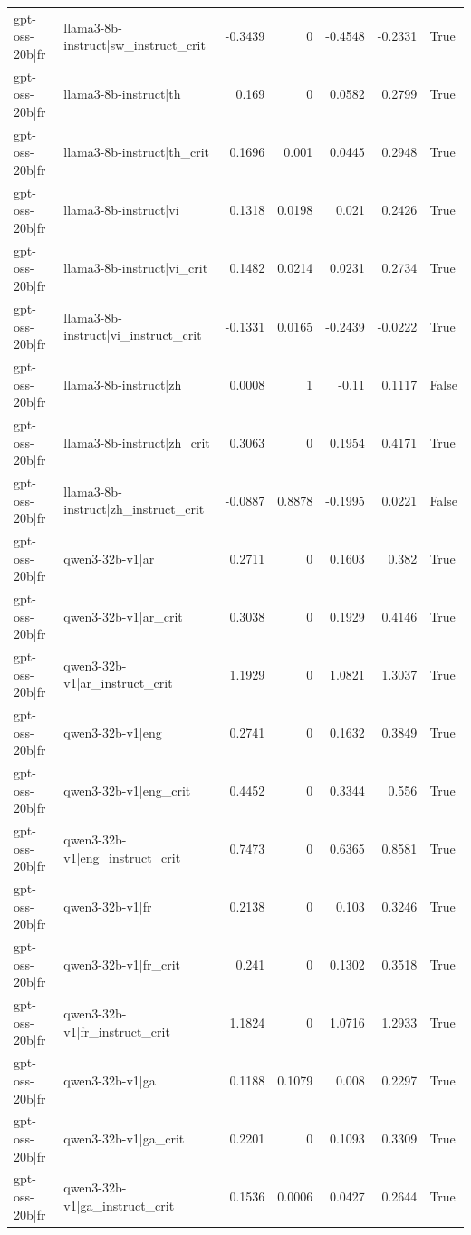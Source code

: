 \begin{table}
\begin{tabular}{l l r r r r l}
gpt-oss-20b|fr & llama3-8b-instruct|sw_instruct_crit & -0.3439 & 0 & -0.4548 & -0.2331 & True \\
gpt-oss-20b|fr & llama3-8b-instruct|th & 0.169 & 0 & 0.0582 & 0.2799 & True \\
gpt-oss-20b|fr & llama3-8b-instruct|th_crit & 0.1696 & 0.001 & 0.0445 & 0.2948 & True \\
gpt-oss-20b|fr & llama3-8b-instruct|vi & 0.1318 & 0.0198 & 0.021 & 0.2426 & True \\
gpt-oss-20b|fr & llama3-8b-instruct|vi_crit & 0.1482 & 0.0214 & 0.0231 & 0.2734 & True \\
gpt-oss-20b|fr & llama3-8b-instruct|vi_instruct_crit & -0.1331 & 0.0165 & -0.2439 & -0.0222 & True \\
gpt-oss-20b|fr & llama3-8b-instruct|zh & 0.0008 & 1 & -0.11 & 0.1117 & False \\
gpt-oss-20b|fr & llama3-8b-instruct|zh_crit & 0.3063 & 0 & 0.1954 & 0.4171 & True \\
gpt-oss-20b|fr & llama3-8b-instruct|zh_instruct_crit & -0.0887 & 0.8878 & -0.1995 & 0.0221 & False \\
gpt-oss-20b|fr & qwen3-32b-v1|ar & 0.2711 & 0 & 0.1603 & 0.382 & True \\
gpt-oss-20b|fr & qwen3-32b-v1|ar_crit & 0.3038 & 0 & 0.1929 & 0.4146 & True \\
gpt-oss-20b|fr & qwen3-32b-v1|ar_instruct_crit & 1.1929 & 0 & 1.0821 & 1.3037 & True \\
gpt-oss-20b|fr & qwen3-32b-v1|eng & 0.2741 & 0 & 0.1632 & 0.3849 & True \\
gpt-oss-20b|fr & qwen3-32b-v1|eng_crit & 0.4452 & 0 & 0.3344 & 0.556 & True \\
gpt-oss-20b|fr & qwen3-32b-v1|eng_instruct_crit & 0.7473 & 0 & 0.6365 & 0.8581 & True \\
gpt-oss-20b|fr & qwen3-32b-v1|fr & 0.2138 & 0 & 0.103 & 0.3246 & True \\
gpt-oss-20b|fr & qwen3-32b-v1|fr_crit & 0.241 & 0 & 0.1302 & 0.3518 & True \\
gpt-oss-20b|fr & qwen3-32b-v1|fr_instruct_crit & 1.1824 & 0 & 1.0716 & 1.2933 & True \\
gpt-oss-20b|fr & qwen3-32b-v1|ga & 0.1188 & 0.1079 & 0.008 & 0.2297 & True \\
gpt-oss-20b|fr & qwen3-32b-v1|ga_crit & 0.2201 & 0 & 0.1093 & 0.3309 & True \\
gpt-oss-20b|fr & qwen3-32b-v1|ga_instruct_crit & 0.1536 & 0.0006 & 0.0427 & 0.2644 & True \\

\end{tabular}
\end{table}
